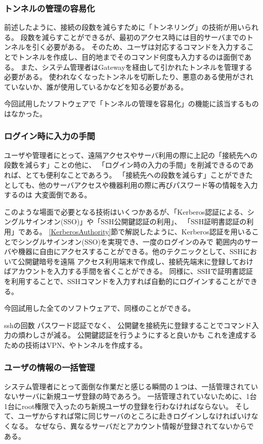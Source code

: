 \documentclass[11pt,a4j,titlepage]{jreport}
\begin{document}
\subsubsection*{トンネルの管理の容易化}
前述したように、接続の段数を減らすために「トンネリング」の技術が用いられる。
段数を減らすことができるが、最初のアクセス時には目的サーバまでのトンネルを引く必要がある。
そのため、ユーザは対応するコマンドを入力することでトンネルを作成し、目的地までそのコマンド何度も入力するのは面倒である。
また、システム管理者はGatewayを経由して引かれたトンネルを管理する必要がある。
使われなくなったトンネルを切断したり、悪意のある使用がされていないか、誰が使用しているかなどを知る必要がある。

今回試用したソフトウェアで「トンネルの管理を容易化」の機能に該当するものはなかった。


\subsubsection*{ログイン時に入力の手間}
ユーザや管理者にとって、遠隔アクセスやサーバ利用の際に上記の「接続先への段数を減らす」ことの他に、
「ログイン時の入力の手間」を削減できるのであれば、とても便利なことであろう。
「接続先への段数を減らす」ことができたとしても、他のサーバアクセスや機器利用の際に再びパスワード等の情報を入力するのは
大変面倒である。

このような場面で必要となる技術はいくつかあるが、「Kerberos認証による、シングルサインオン(SSO)」や「SSH公開鍵認証の利用」、
「SSH証明書認証の利用」である。
\ref{KerberosAuthority}節で解説したように、Kerberos認証を用いることでシングルサインオン(SSO)を実現でき、一度のログインのみで
範囲内のサーバや機器に自由にアクセスすることができる。他のテクニックとして、SSHにおいて公開鍵暗号を遠隔
アクセス利用端末で作成し、接続先端末に登録しておけばアカウントを入力する手間を省くことができる。
同様に、SSHで証明書認証を利用することで、SSHコマンドを入力すれば自動的にログインすることができる。
\par 今回試用した全てのソフトウェアで、同様のことができる。

sshの回数
パスワード認証でなく、
公開鍵を接続先に登録することでコマンド入力の煩わしさが減る。
公開鍵認証を行うようにすると良いかも
これを達成するための技術はVPN、やトンネルを作成する。
\fi

\subsubsection{ユーザの情報の一括管理}
システム管理者にとって面倒な作業だと感じる瞬間の１つは、一括管理されていないサーバに新規ユーザ登録の時であろう。
一括管理されていないために、1台1台にroot権限で入ったのち新規ユーザの登録を行わなければならない。
そして、ユーザからすれば常に同じサーバのところに赴きログインしなければいけなくなる。
なぜなら、異なるサーバだとアカウント情報が登録されてないからである。
\end{document}
